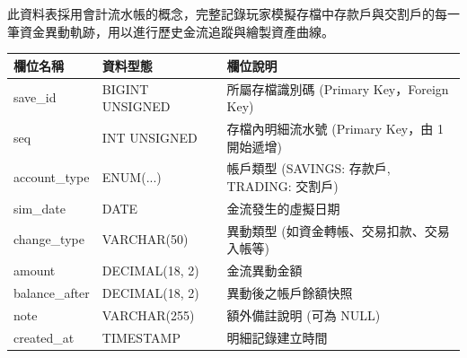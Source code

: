\documentclass[UTF8, a4paper, 12pt, fontset=none]{ctexart}
\begin{document}
    此資料表採用會計流水帳的概念，完整記錄玩家模擬存檔中存款戶與交割戶的每一筆資金異動軌跡，用以進行歷史金流追蹤與繪製資產曲線。

    \begin{center}
    \begin{tabular}{|l|l|p{8cm}|}
    \hline
    \textbf{欄位名稱} & \textbf{資料型態} & \textbf{欄位說明} \\ \hline
    save\_id & BIGINT UNSIGNED & 所屬存檔識別碼 (Primary Key，Foreign Key) \\ \hline
    seq & INT UNSIGNED & 存檔內明細流水號 (Primary Key，由 1 開始遞增) \\ \hline
    account\_type & ENUM(...) & 帳戶類型 (SAVINGS: 存款戶, TRADING: 交割戶) \\ \hline
    sim\_date & DATE & 金流發生的虛擬日期 \\ \hline
    change\_type & VARCHAR(50) & 異動類型 (如資金轉帳、交易扣款、交易入帳等) \\ \hline
    amount & DECIMAL(18, 2) & 金流異動金額 \\ \hline
    balance\_after & DECIMAL(18, 2) & 異動後之帳戶餘額快照 \\ \hline
    note & VARCHAR(255) & 額外備註說明 (可為 NULL) \\ \hline
    created\_at & TIMESTAMP & 明細記錄建立時間 \\ \hline
    \end{tabular}
    \end{center}
\end{document}
